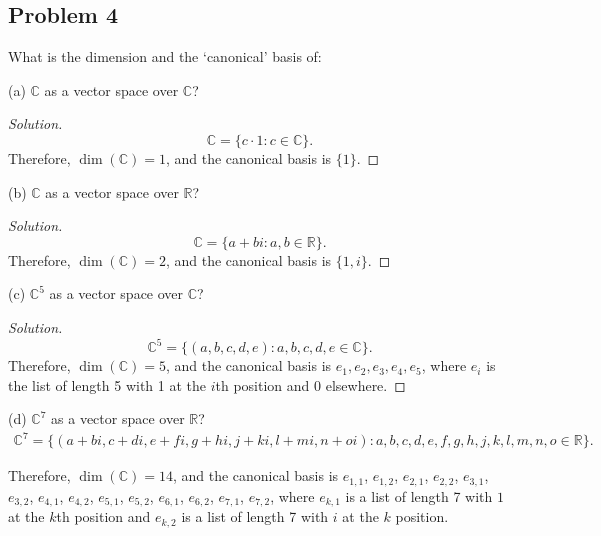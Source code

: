 \documentclass{article}
\begin{document}
\subsection*{Problem 4}
What is the dimension and the `canonical' basis of:
\begin{description}
\item{(a)}  $\mathbb{C}$ as a vector space over $\mathbb{C}$? 
\begin{proof}[Solution]
    $$\mathbb{C} = \{c\cdot 1:c\in\mathbb{C}\}.$$
    Therefore, $\dim (\mathbb{C}) = 1$, and the canonical basis is $\{1\}$.
\end{proof}
\item{(b)} $\mathbb{C}$ as a vector space over $\mathbb{R}$? 
\begin{proof}[Solution]
    $$\mathbb{C} = \{a + bi: a, b\in\mathbb{R}\}.$$
    Therefore, $\dim (\mathbb{C}) = 2$, and the canonical basis is $\{1, i\}$.
\end{proof}
\item{(c)} $\mathbb{C}^5$ as a vector space over $\mathbb{C}$?
\begin{proof}[Solution]
    $$\mathbb{C}^5 = \{(a, b, c, d, e):a, b, c, d, e\in\mathbb{C}\}.$$
    Therefore, $\dim (\mathbb{C}) = 5$, and the canonical basis is $e_1, e_2, e_3, e_4, e_5$, where 
    $e_i$ is the list of length 5 with 1 at the $i$th position and 0 elsewhere.
\end{proof}
\item{(d)} $\mathbb{C}^7$ as a vector space over $\mathbb{R}$?
\begin{align*}
    \mathbb{C}^7 = \{(a+bi, c+di, e+fi, g+hi, j+ki, l+mi, n+oi):a, b, c, d, e, f, g, h, j, k, l, 
    m, n, o\in\mathbb{R}\}.
\end{align*}

Therefore, $\dim (\mathbb{C}) = 14$, and the canonical basis is $e_{1,1}$, $e_{1,2}$, $e_{2,1}$, $e_{2,2}$,
$e_{3,1}$, $e_{3,2}$, $e_{4,1}$, $e_{4,2}$, $e_{5,1}$, $e_{5,2}$, $e_{6,1}$, $e_{6,2}$, $e_{7,1}$, $e_{7,2}$, where 
$e_{k,1}$ is a list of length 7 with $1$ at the $k$th position and $e_{k,2}$ is a list of 
length 7 with $i$ at the $k$ position.
\end{description}

\newpage
\end{document}

